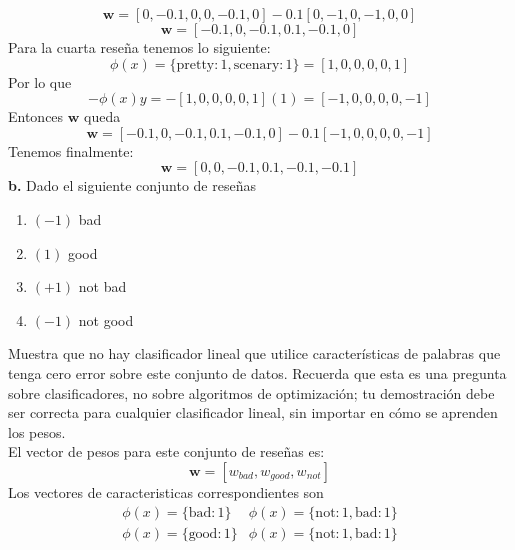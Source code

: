 \documentclass[14pt,a4paper]{report}
\begin{document}
\begin{equation*}
	\mathbf{w}=[0,-0.1,0,0,-0.1,0]-0.1[0,-1,0,-1,0,0]
\end{equation*}
\begin{equation*}
	\mathbf{w}=[-0.1,0,-0.1,0.1,-0.1,0]
\end{equation*}
Para la cuarta reseña tenemos lo siguiente:\\
\begin{equation*}
	\phi(x)=\{\text{pretty}:1,\text{scenary}:1\}=[1,0,0,0,0,1]
\end{equation*}
Por lo que
\begin{equation*}
	-\phi(x)y=-[1,0,0,0,0,1](1)=[-1,0,0,0,0,-1]
\end{equation*}
Entonces $\mathbf{w}$ queda
\begin{equation*}
	\mathbf{w}=[-0.1,0,-0.1,0.1,-0.1,0]-0.1[-1,0,0,0,0,-1]
\end{equation*}
Tenemos finalmente:
\begin{equation*}
	\mathbf{w}=[0,0,-0.1,0.1,-0.1,-0.1]
\end{equation*}
\textbf{b.} Dado el siguiente conjunto de reseñas
\begin{enumerate}
	\item $(-1)$ bad
	\item $(1)$ good
	\item $(+1)$ not bad
	\item $(-1)$ not good
\end{enumerate}
Muestra que no hay clasificador lineal que utilice características de palabras que tenga
cero error sobre este conjunto de datos. Recuerda que esta es una pregunta sobre clasificadores, no sobre algoritmos de optimización; tu demostración debe ser correcta para cualquier clasificador lineal, sin importar en cómo se aprenden los pesos.\\
El vector de pesos para este conjunto de reseñas es:\\
\begin{equation*}
	\mathbf{w}=[w_{bad},w_{good},w_{not}]
\end{equation*}
Los vectores de caracteristicas correspondientes son
\begin{equation*}
\begin{array}{cc}
\phi(x)=\{\text{bad}:1\} & \phi(x)=\{\text{not}:1,\text{bad}:1\} \\
\phi(x)=\{\text{good}:1\} &  \phi(x)=\{\text{not}:1,\text{bad}:1\} \\
\end{array}
\end{equation*}
\end{document}
